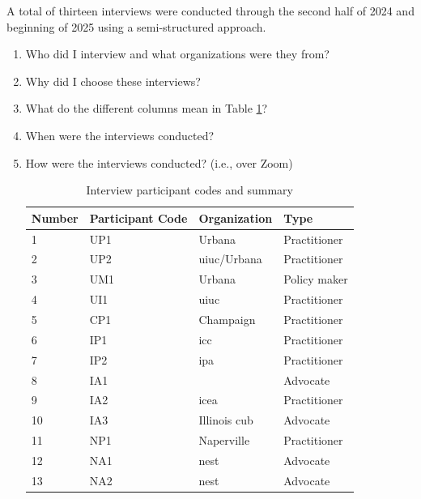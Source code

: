 A total of thirteen interviews were conducted through the second half of 2024
and beginning of 2025 using a semi-structured approach.

\begin{enumerate}
    \item Who did I interview and what organizations were they from?
    \item Why did I choose these interviews?
    \item What do the different columns mean in Table \ref{tab:interviewees}?
    \item When were the interviews conducted?
    \item How were the interviews conducted? (i.e., over Zoom)
    
\begin{table}[ht!]
    \centering
    \caption{Interview participant codes and summary}
    \label{tab:interviewees}
    \begin{tabular}{llll}
        \toprule
        Number & Participant Code & Organization & Type \\
        \midrule
        1& UP1 &Urbana& Practitioner\\ %
        2& UP2 &\ac{uiuc}/Urbana& Practitioner\\ %
        3& UM1 &Urbana & Policy maker\\ %
        4& UI1 & \ac{uiuc} & Practitioner\\ %
        5& CP1 & Champaign & Practitioner\\ %
        6& IP1 & \ac{icc} & Practitioner\\ %
        7& IP2 & \ac{ipa} & Practitioner\\ %
        8& IA1 && Advocate\\ %
        9& IA2 &\ac{icea}& Practitioner\\ %
        10& IA3 &Illinois \ac{cub} & Advocate\\ %
        11& NP1 & Naperville & Practitioner\\ %
        12& NA1 &\acs{nest}&Advocate\\ %
        13& NA2 &\acs{nest}&Advocate\\ %
        \bottomrule
    \end{tabular}
\end{table}


\end{enumerate}
